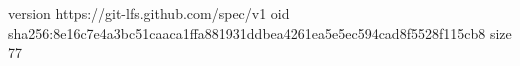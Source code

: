 version https://git-lfs.github.com/spec/v1
oid sha256:8e16c7e4a3bc51caaca1ffa881931ddbea4261ea5e5ec594cad8f5528f115cb8
size 77
